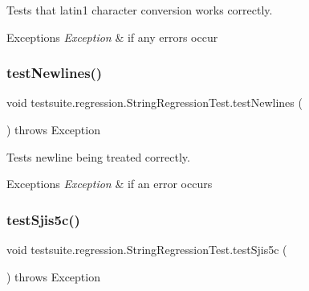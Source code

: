 Tests that \textquotesingle{}latin1\textquotesingle{} character conversion works correctly.


\begin{DoxyExceptions}{Exceptions}
{\em Exception} & if any errors occur \\
\hline
\end{DoxyExceptions}
\mbox{\label{classtestsuite_1_1regression_1_1_string_regression_test_a5e1296ac09b9d40f0116a776de542e0a}} 
\subsubsection{\texorpdfstring{test\+Newlines()}{testNewlines()}}
{\footnotesize\ttfamily void testsuite.\+regression.\+String\+Regression\+Test.\+test\+Newlines (\begin{DoxyParamCaption}{ }\end{DoxyParamCaption}) throws Exception}

Tests newline being treated correctly.


\begin{DoxyExceptions}{Exceptions}
{\em Exception} & if an error occurs \\
\hline
\end{DoxyExceptions}
\mbox{\label{classtestsuite_1_1regression_1_1_string_regression_test_a79556638c7ab71bef596c339006c2e19}} 
\subsubsection{\texorpdfstring{test\+Sjis5c()}{testSjis5c()}}
{\footnotesize\ttfamily void testsuite.\+regression.\+String\+Regression\+Test.\+test\+Sjis5c (\begin{DoxyParamCaption}{ }\end{DoxyParamCaption}) throws Exception}

